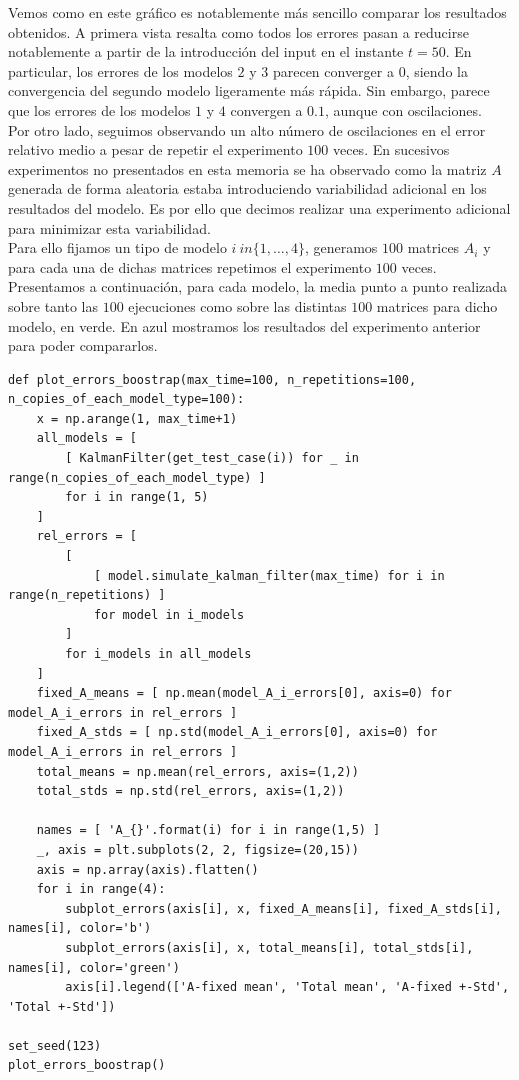 \documentclass[a4paper]{article}
\begin{document}
Vemos como en este gráfico es notablemente más sencillo comparar los resultados obtenidos. A primera vista resalta como todos los errores pasan a reducirse notablemente a partir de la introducción del input en el instante $t=50$. En particular, los errores de los modelos $2$ y $3$ parecen converger a $0$, siendo la convergencia del segundo modelo ligeramente más rápida. Sin embargo, parece que los errores de los modelos $1$ y $4$ convergen a $0.1$, aunque con oscilaciones. \\

Por otro lado, seguimos observando un alto número de oscilaciones en el error relativo medio a pesar de repetir el experimento $100$ veces. En sucesivos experimentos no presentados en esta memoria se ha observado como la matriz $A$ generada de forma aleatoria estaba introduciendo variabilidad adicional en los resultados del modelo. Es por ello que decimos realizar una experimento adicional para minimizar esta variabilidad. \\

Para ello fijamos un tipo de modelo $i \ in \{1, \ldots, 4\}$, generamos $100$ matrices $A_i$ y para cada una de dichas matrices repetimos el experimento $100$ veces. Presentamos a continuación, para cada modelo, la media punto a punto realizada sobre tanto las $100$ ejecuciones como sobre las distintas $100$ matrices para dicho modelo, en verde. En azul mostramos los resultados del experimento anterior para poder compararlos.

\begin{verbatim}
def plot_errors_boostrap(max_time=100, n_repetitions=100, n_copies_of_each_model_type=100):
	x = np.arange(1, max_time+1)
	all_models = [
		[ KalmanFilter(get_test_case(i)) for _ in range(n_copies_of_each_model_type) ]
		for i in range(1, 5)
	]
	rel_errors = [
		[
			[ model.simulate_kalman_filter(max_time) for i in range(n_repetitions) ]
			for model in i_models
		]
		for i_models in all_models
	]
	fixed_A_means = [ np.mean(model_A_i_errors[0], axis=0) for model_A_i_errors in rel_errors ]
	fixed_A_stds = [ np.std(model_A_i_errors[0], axis=0) for model_A_i_errors in rel_errors ]
	total_means = np.mean(rel_errors, axis=(1,2))
	total_stds = np.std(rel_errors, axis=(1,2))
	
	names = [ 'A_{}'.format(i) for i in range(1,5) ]
	_, axis = plt.subplots(2, 2, figsize=(20,15))  
	axis = np.array(axis).flatten()
	for i in range(4):
		subplot_errors(axis[i], x, fixed_A_means[i], fixed_A_stds[i], names[i], color='b')
		subplot_errors(axis[i], x, total_means[i], total_stds[i], names[i], color='green')
		axis[i].legend(['A-fixed mean', 'Total mean', 'A-fixed +-Std', 'Total +-Std'])
	
set_seed(123)
plot_errors_boostrap()
\end{verbatim}
\end{document}
